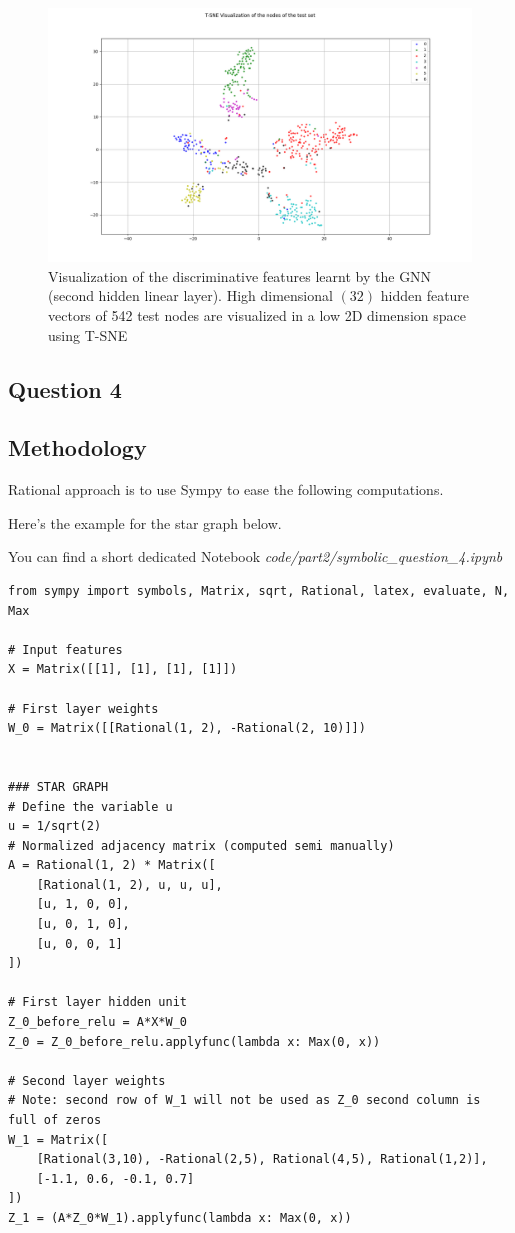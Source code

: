 \documentclass[a4paper]{article}
\begin{document}
\begin{figure}[ht]
    \centering
    \includegraphics[width=1.\textwidth]{figures/tSNE_Cora.png}
    \caption{Visualization of the discriminative features learnt by the GNN (second hidden linear layer). 
    High dimensional $(32)$ hidden feature vectors of 542 test nodes are visualized in a low 2D dimension space using T-SNE}
    \label{fig:tsne_cora}
\end{figure}
\break
\subsection*{Question 4}
\subsection*{Methodology}

Rational approach is to use Sympy to ease the following computations.

Here's the example for the star graph below.

You can find a short dedicated Notebook 
\textit{code/part2/symbolic\_question\_4.ipynb}

\begin{verbatim}
from sympy import symbols, Matrix, sqrt, Rational, latex, evaluate, N, Max

# Input features
X = Matrix([[1], [1], [1], [1]])

# First layer weights
W_0 = Matrix([[Rational(1, 2), -Rational(2, 10)]])


### STAR GRAPH
# Define the variable u
u = 1/sqrt(2)
# Normalized adjacency matrix (computed semi manually)
A = Rational(1, 2) * Matrix([
    [Rational(1, 2), u, u, u],
    [u, 1, 0, 0],
    [u, 0, 1, 0],
    [u, 0, 0, 1]
])

# First layer hidden unit
Z_0_before_relu = A*X*W_0
Z_0 = Z_0_before_relu.applyfunc(lambda x: Max(0, x))

# Second layer weights 
# Note: second row of W_1 will not be used as Z_0 second column is full of zeros
W_1 = Matrix([
    [Rational(3,10), -Rational(2,5), Rational(4,5), Rational(1,2)],
    [-1.1, 0.6, -0.1, 0.7]
])
Z_1 = (A*Z_0*W_1).applyfunc(lambda x: Max(0, x))
\end{verbatim}
\end{document}
